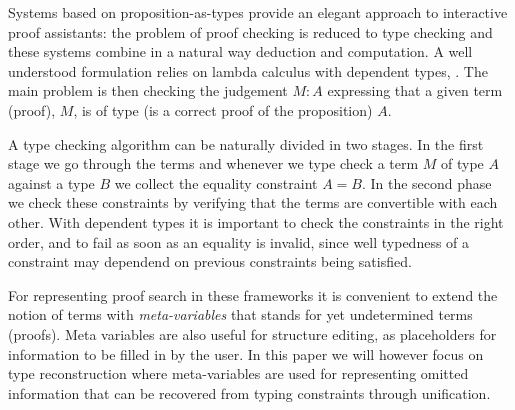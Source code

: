 Systems based on proposition-as-types provide an elegant approach to interactive 
proof assistants: the problem of proof checking is reduced to type checking and 
these systems combine in a natural way deduction and computation. A well understood 
formulation relies on lambda calculus with dependent types, \cite{nordstrom:book,barendregt92lambda,deBruijn:WLF}. The main problem is then checking the judgement $M:A$ expressing that a given term (proof), $M$, is of type (is a correct proof of the proposition) $A$.





% 

A type checking algorithm can be naturally divided in two 
stages\cite{deBruijn:WLF}. In the first stage we go through the terms and
whenever we type check a term $M$ of type $A$ against a type $B$ we collect the
equality constraint $A = B$.
 In the second phase we check these constraints by 
verifying that the terms are convertible with each other. With dependent types it is important to check the 
constraints in the right order, and to fail as soon as an equality is invalid, since well typedness of a 
constraint may dependend on previous constraints being satisfied. 



For representing proof search in these frameworks it is convenient to extend the notion 
of terms with {\it meta-variables} that stands for yet undetermined terms (proofs). Meta variables
are also useful for structure editing, as placeholders for information to be filled in by
the user. In this paper we will however focus on type reconstruction where
meta-variables are used for representing omitted 
information that can be recovered from typing constraints through unification. 




